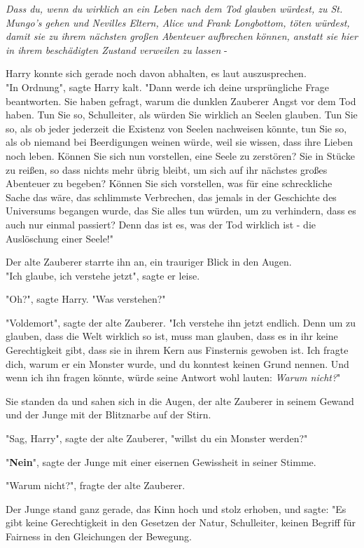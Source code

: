 {\emph{Dass du, wenn du wirklich an ein Leben nach dem Tod glauben würdest, zu St. Mungo's gehen und Nevilles Eltern, Alice und Frank Longbottom, töten würdest, damit sie zu ihrem nächsten großen Abenteuer aufbrechen können, anstatt sie hier in ihrem beschädigten Zustand verweilen zu lassen} -

Harry konnte sich gerade noch davon abhalten, es laut auszusprechen.\\ "In Ordnung", sagte Harry kalt. "Dann werde ich deine ursprüngliche Frage beantworten. Sie haben gefragt, warum die dunklen Zauberer Angst vor dem Tod haben. Tun Sie so, Schulleiter, als würden Sie wirklich an Seelen glauben. Tun Sie so, als ob jeder jederzeit die Existenz von Seelen nachweisen könnte, tun Sie so, als ob niemand bei Beerdigungen weinen würde, weil sie wissen, dass ihre Lieben noch leben. Können Sie sich nun vorstellen, eine Seele zu zerstören? Sie in Stücke zu reißen, so dass nichts mehr übrig bleibt, um sich auf ihr nächstes großes Abenteuer zu begeben? Können Sie sich vorstellen, was für eine schreckliche Sache das wäre, das schlimmste Verbrechen, das jemals in der Geschichte des Universums begangen wurde, das Sie alles tun würden, um zu verhindern, dass es auch nur einmal passiert? Denn das ist es, was der Tod wirklich ist - die Auslöschung einer Seele!"

Der alte Zauberer starrte ihn an, ein trauriger Blick in den Augen.\\ "Ich glaube, ich verstehe jetzt", sagte er leise.

"Oh?", sagte Harry. "Was verstehen?"

"Voldemort", sagte der alte Zauberer. "Ich verstehe ihn jetzt endlich. Denn um zu glauben, dass die Welt wirklich so ist, muss man glauben, dass es in ihr keine Gerechtigkeit gibt, dass sie in ihrem Kern aus Finsternis gewoben ist. Ich fragte dich, warum er ein Monster wurde, und du konntest keinen Grund nennen. Und wenn ich ihn fragen könnte, würde seine Antwort wohl lauten: \emph{Warum nicht?}"

Sie standen da und sahen sich in die Augen, der alte Zauberer in seinem Gewand und der Junge mit der Blitznarbe auf der Stirn.

"Sag, Harry", sagte der alte Zauberer, "willst du ein Monster werden?"

"\textbf{Nein}", sagte der Junge mit einer eisernen Gewissheit in seiner Stimme.

"Warum nicht?", fragte der alte Zauberer.

Der Junge stand ganz gerade, das Kinn hoch und stolz erhoben, und sagte: "Es gibt keine Gerechtigkeit in den Gesetzen der Natur, Schulleiter, keinen Begriff für Fairness in den Gleichungen der Bewegung.

}
